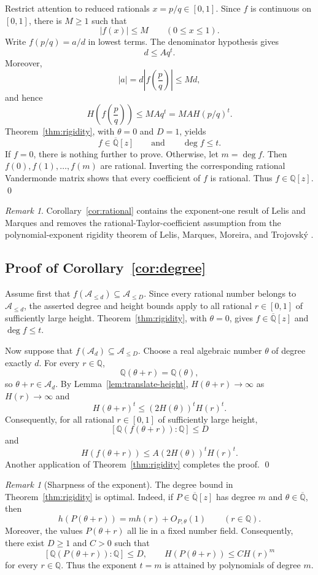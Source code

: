 \documentclass[11pt]{amsart}
\theoremstyle{remark}
\newtheorem{remark}[theorem]{Remark}
\newcommand{\Q}{\mathbb{Q}}
\newcommand{\Qbar}{\overline{\mathbb{Q}}}
\newcommand{\Aatmost}[1]{\mathcal{A}_{\leq #1}}
\newcommand{\Aexact}[1]{\mathcal{A}_{#1}}
\begin{document}
Restrict attention to reduced rationals $x=p/q\in[0,1]$. Since $f$ is continuous on $[0,1]$, there is $M\geq1$ such that
\[
|f(x)|\leq M
\qquad(0\leq x\leq1).
\]
Write $f(p/q)=a/d$ in lowest terms. The denominator hypothesis gives
\[
d\leq Aq^t.
\]
Moreover,
\[
|a|=d\left|f\left(\frac pq\right)\right|
\leq Md,
\]
and hence
\[
H\!\left(f\!\left(\frac pq\right)\right)
\leq M A q^t
=MAH(p/q)^t.
\]
Theorem~\ref{thm:rigidity}, with $\theta=0$ and $D=1$, yields
\[
f\in\Qbar[z]
\qquad\text{and}\qquad
\deg f\leq t.
\]
If $f=0$, there is nothing further to prove. Otherwise, let $m=\deg f$. Then $f(0),f(1),\ldots,f(m)$ are rational. Inverting the corresponding rational Vandermonde matrix shows that every coefficient of $f$ is rational. Thus $f\in\Q[z]$.
\qed

\begin{remark}\label{rem:previous}
Corollary~\ref{cor:rational} contains the exponent-one result of Lelis and Marques \cite{LelisMarques2020} and removes the rational-Taylor-coefficient assumption from the polynomial-exponent rigidity theorem of Lelis, Marques, Moreira, and Trojovsk\'y \cite{LelisMarquesMoreiraTrojovsky2024}. 
\end{remark}

\subsection{Proof of Corollary~\ref{cor:degree}}

Assume first that $f(\Aatmost{d})\subseteq\Aatmost{D}$. Since every rational number belongs to $\Aatmost{d}$, the asserted degree and height bounds apply to all rational $r\in[0,1]$ of sufficiently large height. Theorem~\ref{thm:rigidity}, with $\theta=0$, gives $f\in\Qbar[z]$ and $\deg f\leq t$.

Now suppose that $f(\Aexact{d})\subseteq\Aatmost{D}$. Choose a real algebraic number $\theta$ of degree exactly $d$. For every $r\in\Q$,
\[
\Q(\theta+r)=\Q(\theta),
\]
so $\theta+r\in\Aexact{d}$. By Lemma~\ref{lem:translate-height}, $H(\theta+r)\to\infty$ as $H(r)\to\infty$ and
\[
H(\theta+r)^t
\leq (2H(\theta))^tH(r)^t.
\]
Consequently, for all rational $r\in[0,1]$ of sufficiently large height,
\[
[\Q(f(\theta+r)):\Q]\leq D
\]
and
\[
H(f(\theta+r))
\leq A(2H(\theta))^tH(r)^t.
\]
Another application of Theorem~\ref{thm:rigidity} completes the proof.
\qed

\begin{remark}[Sharpness of the exponent]\label{rem:sharpness}
The degree bound in Theorem~\ref{thm:rigidity} is optimal. Indeed, if
$P\in\Qbar[z]$ has degree $m$ and $\theta\in\Qbar$, then
\[
h(P(\theta+r))
=
m h(r)+O_{P,\theta}(1)
\qquad (r\in\Q).
\]
Moreover, the values $P(\theta+r)$ all lie in a fixed number field.
Consequently, there exist $D\geq1$ and $C>0$ such that
\[
[\Q(P(\theta+r)):\Q]\leq D,
\qquad
H(P(\theta+r))\leq C H(r)^m
\]
for every $r\in\Q$. Thus the exponent $t=m$ is attained by polynomials of
degree $m$.
\end{remark}
\end{document}
